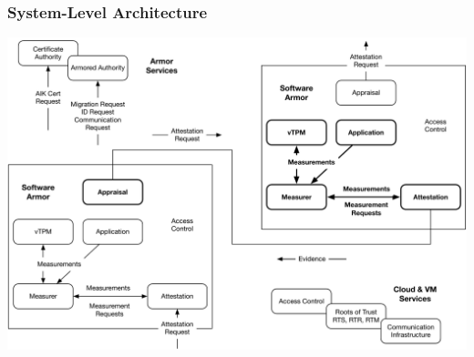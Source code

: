 \documentclass{beamer}
\begin{document}
\begin{frame}
  \frametitle{System-Level Architecture}
  \begin{center}
  \includegraphics[width=1.0\textwidth]{figures/system.pdf}
  \end{center}
\end{frame}

  
\end{document}
